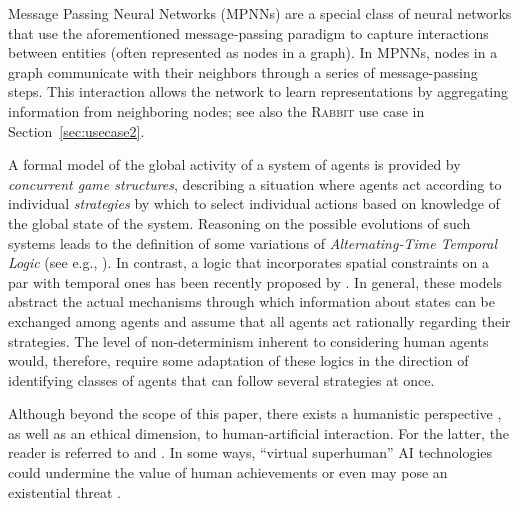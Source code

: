 Message Passing Neural Networks (MPNNs) \cite{papillon2023} are a special class of neural networks that use the aforementioned message-passing paradigm to capture interactions between entities (often represented as nodes in a graph).
In MPNNs, nodes in a graph communicate with their neighbors through a series of message-passing steps. This interaction allows the network to learn representations by aggregating information from neighboring nodes; see also the \textsc{Rabbit} use case in Section~\ref{sec:usecase2}.

A formal model of the global activity of a system of agents is provided by \textit{concurrent game structures}, describing a situation where agents act according to individual \textit{strategies} by which to select individual actions based on knowledge of the global state of the system.
Reasoning on the possible evolutions of such systems leads to the definition of some variations of \textit{Alternating-Time Temporal Logic} (see e.g., \cite{AHK02,ALNR17,MMPV16}). In contrast, a logic that incorporates spatial constraints on a par with temporal ones has been recently proposed by \cite{BLP24}.
In general, these models abstract the actual mechanisms through which information about states can be exchanged among agents and assume that all agents act rationally regarding their strategies. 
The level of non-determinism inherent to considering human agents would, therefore, require some adaptation of these logics in the direction of identifying classes of agents that can follow several strategies at once.

Although beyond the scope of this paper, there exists a humanistic perspective \cite{KnellR24}, as well as an ethical dimension, to 
human-artificial interaction. 
For the latter, the reader is referred to \cite{KumarCx23,Karlan23} and \cite{Nieto24}.
In some ways, ``virtual superhuman''  AI technologies could undermine the value of human achievements \cite{SchaapSS24} or even may pose an existential threat \cite{KumarC23a}.

